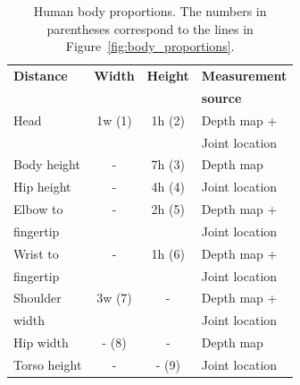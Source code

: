 \documentclass[number,preprint,review,12pt]{elsarticle}
\begin{document}
\singlespacing
\begin{table}
\begin{center}
\begin{tabular}{|l|c|c|l|}
\hline
\textbf{Distance} & \textbf{Width} & \textbf{Height} & \textbf{Measurement} \\ 
\textbf{        } & \textbf{     } & \textbf{      } & \textbf{source} \\ \hline
Head & 1w (1) & 1h (2) & Depth map + \\ 
     &        &        & Joint location \\ \hline
Body height & - & 7h (3) & Depth map \\ \hline
Hip height & - & 4h (4) & Joint location \\ \hline
Elbow to & - & 2h (5) & Depth map + \\ 
fingertip &   &       & Joint location \\ \hline
Wrist to  & - & 1h (6) & Depth map + \\ 
fingertip &   &       & Joint location \\ \hline
Shoulder  & 3w (7) & - & Depth map + \\ 
width     &  &   & Joint location \\ \hline
Hip width & - (8) & - & Depth map \\ \hline
Torso height & - & - (9) & Joint location \\ 
\hline
\end{tabular}
\end{center}
\caption{Human body proportions. The numbers in parentheses correspond 
to the lines in Figure~\ref{fig:body_proportions}.}
\label{tbl:human_body_proportions}
\end{table}
\end{document}
